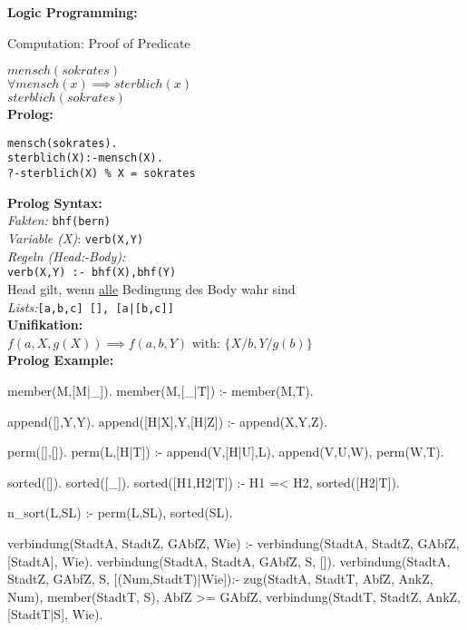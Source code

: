 \begin{breakbox}
\textbf{Logic Programming:}
\begin{mdframed}
  \begin{center}
  	Computation: Proof of Predicate 
  \end{center}
\end{mdframed}

$mensch(sokrates)$ \\
$\forall mensch(x) \implies sterblich(x)$ \\
$sterblich(sokrates)$\\

\textbf{Prolog:}
\vspace{-5mm}
\begin{verbatim}
mensch(sokrates).
sterblich(X):-mensch(X).
?-sterblich(X) % X = sokrates
\end{verbatim}
\textbf{Prolog Syntax:}\\
\emph{Fakten:} \texttt{bhf(bern)}\\
\emph{Variable (X)}: \texttt{verb(X,Y)}\\
\emph{Regeln (Head:-Body):}\\ \texttt{verb(X,Y) :- bhf(X),bhf(Y)}\\
Head gilt, wenn \underline{alle} Bedingung des Body wahr sind\\
\emph{Lists:}\texttt{[a,b,c] [], [a|[b,c]]}\\

\textbf{Unifikation:}\\
$f(a,X,g(X)) \implies f(a,b,Y)$ 
$\text{with: } \{X/b, Y/g(b)\}$\\

\textbf{Prolog Example:}\\
\vspace{-5mm}
\begin{prologcode}

member(M,[M|_]).
member(M,[_|T]) :- member(M,T).

append([],Y,Y).
append([H|X],Y,[H|Z]) :- append(X,Y,Z).

perm([],[]).
perm(L,[H|T]) :- append(V,[H|U],L), append(V,U,W), perm(W,T).


sorted([]).
sorted([_]).
sorted([H1,H2|T]) :- H1 =< H2, sorted([H2|T]).


n_sort(L,SL) :- perm(L,SL), sorted(SL).


verbindung(StadtA, StadtZ, GAbfZ, Wie) :-
verbindung(StadtA, StadtZ, GAbfZ, [StadtA], Wie).
verbindung(StadtA, StadtA, GAbfZ, S, []).
verbindung(StadtA, StadtZ, GAbfZ, S, [(Num,StadtT)|Wie]):-
zug(StadtA, StadtT, AbfZ, AnkZ, Num),
\+ member(StadtT, S),
AbfZ >= GAbfZ,
verbindung(StadtT, StadtZ, AnkZ, [StadtT|S], Wie).
\end{prologcode}
\end{breakbox}

